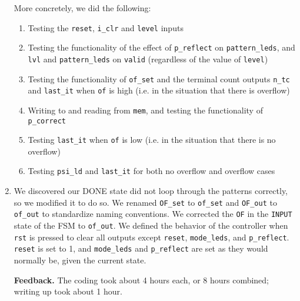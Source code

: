 \documentclass[12pt]{article}
\begin{document}
\begin{enumerate}[label=\textbf{Question \arabic*.}]
More concretely, we did the following:
\begin{enumerate}
    \item Testing the \texttt{reset}, \texttt{i\_clr} and \texttt{level} inputs
    \item Testing the functionality of the effect of \texttt{p\_reflect} on \texttt{pattern\_leds}, and \texttt{lvl} and \texttt{pattern\_leds} on \texttt{valid} (regardless of the value of \texttt{level})
    \item Testing the functionality of \texttt{of\_set} and the terminal count outputs \texttt{n\_tc} and \texttt{last\_it} when \texttt{of} is high (i.e. in the situation that there is overflow)
    \item Writing to and reading from \texttt{mem}, and testing the functionality of \texttt{p\_correct}
    \item Testing \texttt{last\_it} when \texttt{of} is low (i.e. in the situation that there is no overflow)
    \item Testing \texttt{psi\_ld} and \texttt{last\_it} for both no overflow and overflow cases
\end{enumerate}
%
\item We discovered our DONE state did not loop through the patterns correctly, so we modified it to do so. We renamed \texttt{OF\_set} to \texttt{of\_set} and \texttt{OF\_out} to \texttt{of\_out} to standardize naming conventions. We corrected the \texttt{OF} in the \texttt{INPUT} state of the FSM to \texttt{of\_out}. We defined the behavior of the controller when \texttt{rst} is pressed to clear all outputs except \texttt{reset}, \texttt{mode\_leds}, and \texttt{p\_reflect}. \texttt{reset} is set to 1, and \texttt{mode\_leds} and \texttt{p\_reflect} are set as they would normally be, given the current state.
%
\item[\textbf{Feedback.}] The coding took about 4 hours each, or 8 hours combined; writing up took about 1 hour.
%
\end{enumerate}
\end{document}
